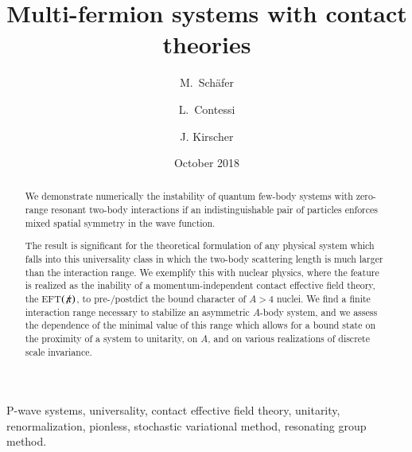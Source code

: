\documentclass[preprint,12pt]{elsarticle}
\newcommand{\eftnopi}{\mbox{EFT$(\not \! \pi)$}}
\begin{document}
\begin{frontmatter}

\title{Multi-fermion systems with contact theories}
\author{M.~Sch{\"a}fer}
\address{Nuclear Physics Institute of the Czech Academy of Sciences, 25069 \v{R}e\v{z}, Czech Republic}
\address{Czech Technical University in Prague, Faculty of Nuclear Sciences and Physical Engineering, B\v{r}ehov\'{a} 7, 11519 Prague 1, Czech Republic}
\author{L.~Contessi} 
\address{Racah Institute of Physics, The Hebrew University, 91904 Jerusalem, 
Israel} 
\address{ESNT, IRFU, CEA, Universite Paris Saclay, F-91191 Gif-sur-Yvette, France} 
\author{J. Kirscher}
\address{Theoretical Physics Division, School of Physics and Astronomy,
The University of Manchester, Manchester, M13 9PL, United Kingdom} 
\date{October 2018}


\begin{abstract}
We demonstrate numerically the instability of quantum few-body systems with zero-range resonant two-body
interactions if an indistinguishable pair of particles enforces mixed spatial symmetry in the wave function.

The result is significant for the theoretical formulation of any physical system which falls into this
universality class in which the two-body scattering length is much larger than the interaction range.
We exemplify this with nuclear physics, where the feature is realized as the inability
of a momentum-independent contact effective field theory, the \eftnopi, to
pre-/postdict the bound character of $A>4$ nuclei. 
We find a finite interaction range necessary to stabilize an asymmetric $A$-body system, and we
assess the dependence of the minimal value of this range which allows for a bound state on the
proximity of a system to unitarity, on $A$, and on various realizations of discrete scale invariance.
\end{abstract}

\begin{keyword} 
P-wave systems, universality, contact effective field theory, unitarity, renormalization, pionless, stochastic variational method, resonating group method.
\end{keyword} 

\end{frontmatter}
\end{document}

